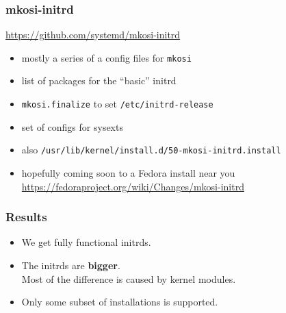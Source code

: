 \documentclass[]{beamer}
\newcommand\pp{}
\begin{document}
\begin{frame}[fragile]
  \frametitle{mkosi-initrd}

  \url{https://github.com/systemd/mkosi-initrd}

  \quad

  \pp

  \begin{itemize}
  \item mostly a series of a config files for \texttt{mkosi}
    \pp
  \item list of packages for the ``basic'' initrd
    \pp
  \item \texttt{mkosi.finalize} to set \texttt{/etc/initrd-release}
    \pp
  \item set of configs for sysexts

  \quad

    \pp
  \item also \texttt{/usr/lib/kernel/install.d/50-mkosi-initrd.install}

  \quad

    \pp
  \item hopefully coming soon to a Fedora install near you\\
    \small{\url{https://fedoraproject.org/wiki/Changes/mkosi-initrd}}
    
  \end{itemize}
\end{frame}

\begin{frame}
  \frametitle{Results}

  \begin{itemize}
  \pp
  \item We get fully functional initrds.

  \pp
  \item The initrds are \textbf{bigger}.\\
  \pp
  Most of the difference is caused by kernel modules.

  \pp
  \item Only some subset of installations is supported.
  \end{itemize}
\end{frame}
\end{document}
